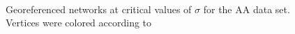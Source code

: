 \documentclass[12pt]{article}
\begin{document}
\begin{figure}[]
\\
\caption{\footnotesize Georeferenced networks at critical values of $\sigma$ for the AA data set.
Vertices were colored according to}
\label{fig:netsAA}
\end{figure}
\end{document}
